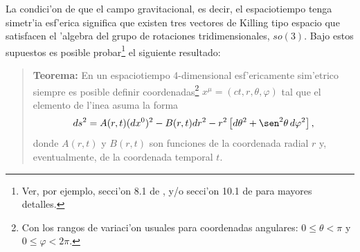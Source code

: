La condici'on de que el campo gravitacional, es decir, el espaciotiempo tenga
simetr'ia esf'erica significa que existen tres vectores de Killing tipo espacio que satisfacen el 'algebra del grupo de rotaciones tridimensionales, $so(3)$. Bajo estos supuestos es posible probar\footnote{Ver, por ejemplo, secci'on 8.1 de \cite{Wei72}, y/o secci'on 10.1 de \cite{FC} para mayores detalles.} el siguiente resultado:

\begin{quotation}
{\bf Teorema:} En un espaciotiempo 4-dimensional esf'ericamente sim'etrico
siempre es posible definir coordenadas\footnote{Con los rangos de variaci'on usuales para coordenadas angulares: $0\le\theta<\pi$ y $0\le\varphi <2\pi$.} $x^\mu=(ct,r,\theta,\varphi)$ tal
que el elemento de l'inea asuma la forma
\begin{equation}\label{dsoriginal}
ds^2=A(r,t)(dx^0)^2-B(r,t)dr^2-r^2\left[ d\theta^2+\sen^2\theta
\,d\varphi^2\right],
\end{equation}
donde $A(r,t)$ y $B(r,t)$ son funciones de la coordenada radial $r$ y,
eventualmente, de la coordenada temporal $t$.
\end{quotation}

